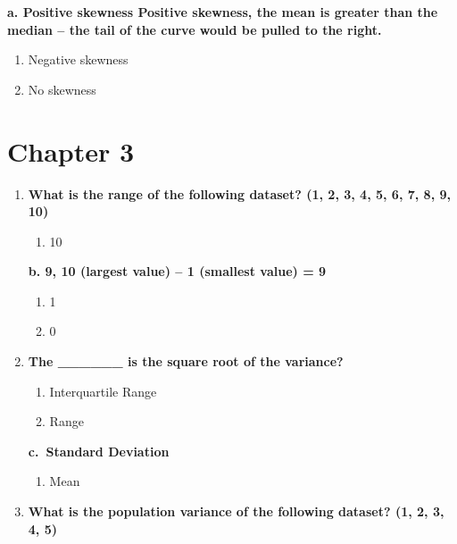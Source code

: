 \documentclass[
  letterpaper,
  DIV=11,
  numbers=noendperiod]{scrreprt}
\providecommand{\tightlist}{%
  \setlength{\itemsep}{0pt}\setlength{\parskip}{0pt}}
\begin{document}
\begin{enumerate}
  \textbf{a. Positive skewness Positive skewness, the mean is greater
  than the median -- the tail of the curve would be pulled to the
  right.}

  \begin{enumerate}
  \def\labelenumii{\alph{enumii}.}
  \setcounter{enumii}{1}
  \item
    Negative skewness
  \item
    No skewness
  \end{enumerate}
\end{enumerate}

\section{Chapter 3}\label{chapter-3-1}

\begin{enumerate}
\def\labelenumi{\arabic{enumi}.}
\item
  \textbf{What is the range of the following dataset? (1, 2, 3, 4, 5, 6,
  7, 8, 9, 10)}

  \begin{enumerate}
  \def\labelenumii{\alph{enumii}.}
  \tightlist
  \item
    10
  \end{enumerate}

  \textbf{b. 9, 10 (largest value) -- 1 (smallest value) = 9}

  \begin{enumerate}
  \def\labelenumii{\alph{enumii}.}
  \setcounter{enumii}{2}
  \item
    1
  \item
    0
  \end{enumerate}
\item
  \textbf{The \_\_\_\_\_\_ is the square root of the variance?}

  \begin{enumerate}
  \def\labelenumii{\alph{enumii}.}
  \item
    Interquartile Range
  \item
    Range
  \end{enumerate}

  \textbf{c.~Standard Deviation}

  \begin{enumerate}
  \def\labelenumii{\alph{enumii}.}
  \setcounter{enumii}{3}
  \tightlist
  \item
    Mean
  \end{enumerate}
\item
  \textbf{What is the population variance of the following dataset? (1,
  2, 3, 4, 5)}


\end{enumerate}
\end{document}
